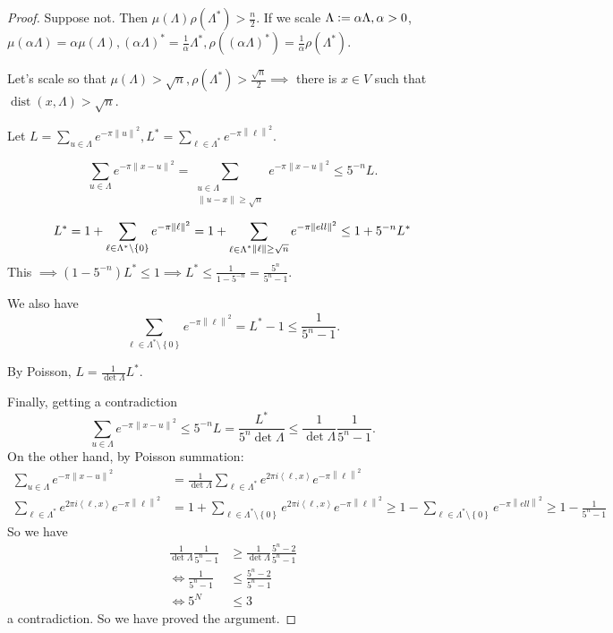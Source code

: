 \documentclass{report}
\def \dist {\operatorname{dist}}
\def \dist {\operatorname{dist}}
\newcommand{\inner}[2]{\left\langle #1, #2\right\rangle}
\newcommand{\norm}[1]{\left\| #1 \right\|}
\newcommand{\set}[1]{\left\{ #1 \right\}}
\newcommand{\defeq}{\vcentcolon=}
\theoremstyle{definition}
\theoremstyle{remark}
\numberwithin{equation}{section}
\begin{document}
\begin{proof}
    Suppose not. Then $\mu(\Lambda)\rho(\Lambda^*) > \frac{n}{2}$. If we scale $\Lambda \defeq \alpha \Lambda, \alpha > 0$, $\mu(\alpha\Lambda) = \alpha \mu(\Lambda), (\alpha\Lambda)^* = \frac{1}{\alpha}\Lambda^*, \rho((\alpha\Lambda)^*) = \frac{1}{\alpha}\rho(\Lambda^*)$.

    Let's scale so that $\mu(\Lambda) > \sqrt{n}, \rho(\Lambda^*) > \frac{\sqrt{n}}{2} \implies$ there is $x \in V$ such that $\dist(x, \Lambda) > \sqrt{n}$.

    Let $L = \sum_{u\in\Lambda} e^{-\pi\norm{u}^2}, L^* = \sum_{\ell \in \Lambda^*}e^{-\pi\norm{\ell}^2}$.

    \[ 
        \sum_{u \in \Lambda}e^{-\pi\norm{x - u}^2} = \sum_{\substack{u \in \Lambda \\ \norm{u - x} \geq \sqrt{n}}} e^{-\pi\norm{x - u}^2} \leq 5^{-n}L.
    \]

    \[L^* = 1 + \sum_{\ell \in \Lambda^* \setminus \set{0}} e^{-\pi\norm{\ell}^2} = 1 + \sum_{\substack{\ell \in \Lambda^*}\\ \norm{\ell} \geq \sqrt{n}} e^{-\pi\norm{ell}^2} \leq 1 + 5^{-n}L^*\]
    This $\implies (1 - 5^{-n})L^* \leq 1 \implies L^* \leq \frac{1}{1 - 5^{-n}} = \frac{5^n}{5^n - 1}$.

    We also have \[\sum_{\ell \in \Lambda^* \setminus \set{0}} e^{-\pi\norm{\ell}^2} = L^* - 1 \leq \frac{1}{5^n-1}.\]

    By Poisson, $L = \frac{1}{\det \Lambda}L^*$.

    Finally, getting a contradiction \[
        \sum_{u \in \Lambda}e^{-\pi\norm{x - u}^2} \leq 5^{-n}L = \frac{L^*}{5^n\det\Lambda}\leq \frac{1}{\det\Lambda}\frac{1}{5^n-1}.    
    \]
    On the other hand, by Poisson summation: \begin{align*}
        \sum_{u \in \Lambda}e^{-\pi\norm{x - u}^2} & = \frac{1}{\det\Lambda}\sum_{\ell \in \Lambda^*} e^{2\pi i \inner{\ell}{x}}e^{-\pi\norm{\ell}^2} \\
        \sum_{\ell \in \Lambda^*} e^{2\pi i\inner{\ell}{x}} e^{-\pi\norm{\ell}^2} & = 1 + \sum_{\ell \in \Lambda^* \setminus \set{0}} e^{2\pi i\inner{\ell}{x}} e^{-\pi\norm{\ell}^2} \geq 1 - \sum_{\ell \in \Lambda^* \setminus \set{0}} e^{-\pi\norm{ell}^2} \geq 1 - \frac{1}{5^n-1}
    \end{align*}
    So we have \begin{align*}
        \frac{1}{\det\Lambda}\frac{1}{5^n-1} & \geq \frac{1}{\det\Lambda}\frac{5^n-2}{5^n-1} \\
        \iff \frac{1}{5^n-1} & \leq \frac{5^n-2}{5^n-1} \\
        \iff 5^N & \leq 3 
    \end{align*}
    a contradiction. So we have proved the argument.
\end{proof}
\end{document}
